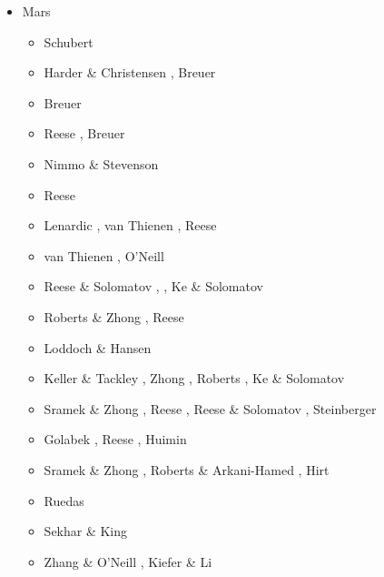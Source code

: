 \begin{itemize}
\item Mars \\
\begin{scriptsize}
\begin{itemize}
\item[\nineteenninety] Schubert \etal \cite{scbg90}
\item[\nineteenninetysix] Harder \& Christensen \cite{hach96}, Breuer \etal \cite{brzy96}
\item[\nineteenninetyseven] Breuer \etal \cite{brys97}
\item[\nineteenninetyeight] Reese \etal \cite{resm98}, Breuer \etal \cite{brys98}
\item[\twothousandone] Nimmo \& Stevenson \cite{nist01}
\item[\twothousandtwo] Reese \etal \cite{resb02}
\item[\twothousandfour] Lenardic \etal \cite{lenm04}, van Thienen \etal \cite{vavv04c}, 
                        Reese \etal \cite{resb04}
\item[\twothousandfive] van Thienen \etal \cite{vavv05}, O'Neill \etal \cite{onml05}
\item[\twothousandsix] Reese \& Solomatov \cite{reso06}, \cite{losh06,rozh06}, Ke \& Solomatov \cite{keso06}
\item[\twothousandseven] Roberts \& Zhong \cite{rozh07}, Reese \etal \cite{reso07b}
\item[\twothousandeight] Loddoch \& Hansen \cite{loha08}
\item[\twothousandnine] Keller \& Tackley \cite{keta09}, Zhong \cite{zhon09}, 
                        Roberts \etal \cite{rolm09}, Ke \& Solomatov \cite{keso09}
\item[\twothousandten] Sramek \& Zhong \cite{srzh10}, Reese \etal \cite{reos10}, 
                       Reese \& Solomatov \cite{reso10}, Steinberger \etal \cite{stwt10}
\item[\twothousandeleven] Golabek \etal \cite{gokg11}, Reese \etal \cite{reos11}, Huimin \etal \cite{jizl11}
\item[\twothousandtwelve] Sramek \& Zhong \cite{srzh12}, Roberts \& Arkani-Hamed \cite{roar12}, 
                          Hirt \etal \cite{hick12}
\item[\twothousandthirteen] Ruedas \etal \cite{ruts13}
\item[\twothousandfourteen] Sekhar \& King \cite{seki14}
\item[\twothousandsixteen] Zhang \& O'Neill \cite{zhon16}, Kiefer \& Li \cite{kili16}

\end{itemize}
\end{scriptsize}
\end{itemize}

